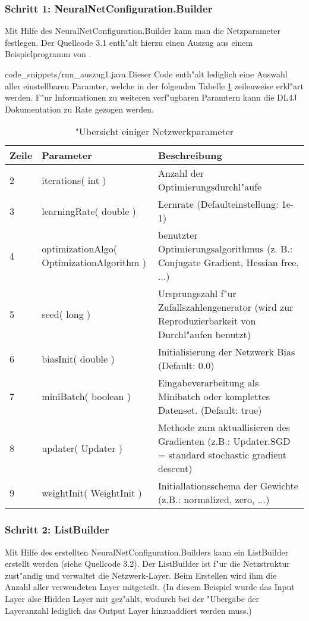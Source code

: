 {\subsubsection{Schritt 1: NeuralNetConfiguration.Builder}
Mit Hilfe des NeuralNetConfiguration.Builder kann man die Netzparameter festlegen. Der Quellcode 3.1 enth"alt hierzu einen Auszug aus einem Beispielprogramm von \cite{DL4J}.

{code_snippets/rnn_auszug1.java}
Dieser Code enth"alt lediglich eine Auswahl aller einstellbaren Paramter, welche in der folgenden Tabelle \ref{tbl:beispieltabelle} zeilenweise erkl"art werden. F"ur Informationen zu weiteren verf"ugbaren Paramtern kann die DL4J Dokumentation zu Rate gezogen werden.

\begin{table} [h]
\begin{tabular}{|p{0.8cm}|p{3.7cm}|p{8.8cm}|}\hline
   \textbf{Zeile} & \textbf{Parameter} & \textbf{Beschreibung} \\ \hline
   2 & iterations( int ) & Anzahl der Optimierungsdurchl"aufe \\ \hline
   3 & learningRate( double ) & Lernrate (Defaulteinstellung: 1e-1) \\ \hline
   4 & optimizationAlgo( OptimizationAlgorithm ) & benutzter Optimierungsalgorithmus (z. B.: Conjugate Gradient, Hessian free, ...) \\ \hline
  5 & seed( long ) & Ursprungszahl f"ur Zufallszahlengenerator (wird zur Reproduzierbarkeit von Durchl"aufen benutzt) \\ \hline
  6 & biasInit( double ) & Initialisierung der Netzwerk Bias (Default: 0.0) \\ \hline
  7 & miniBatch( boolean ) & Eingabeverarbeitung als Minibatch oder komplettes Datenset. (Default: true) \\ \hline
  8 & updater( Updater ) & Methode zum aktuallisieren des Gradienten (z.B.: Updater.SGD = standard stochastic gradient descent) \\ \hline
   9 & weightInit( WeightInit ) & Initiallationsschema der Gewichte (z.B.: normalized, zero, ...) \\ \hline
 \end{tabular}
\caption{"Ubersicht einiger Netzwerkparameter}
\label{tbl:beispieltabelle} %
\end{table}

\subsubsection{Schritt 2: ListBuilder}
Mit Hilfe des erstellten NeuralNetConfiguration.Builders kann ein ListBuilder erstellt werden (siehe Quellcode 3.2). Der ListBuilder ist f"ur die Netzstruktur zust"andig und verwaltet die Netzwerk-Layer. Beim Erstellen wird ihm die Anzahl aller verwendeten Layer mitgeteilt. (In diesem Beispiel wurde das Input Layer alse Hidden Layer mit gez"ahlt, wodurch bei der "Ubergabe der Layeranzahl lediglich das Output Layer hinzuaddiert werden muss.)

}
